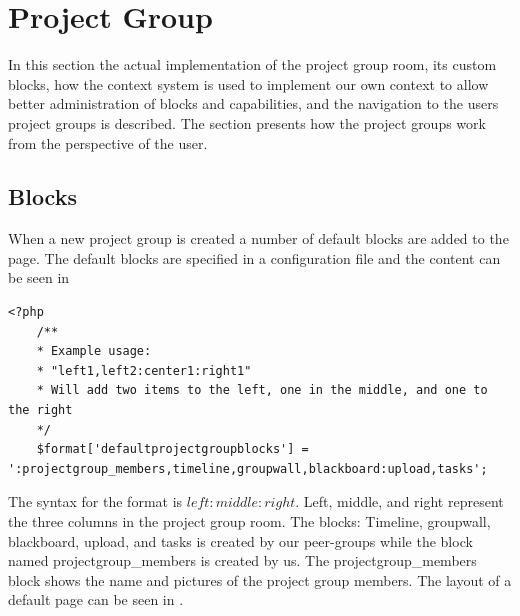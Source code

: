 \section{Project Group \viewroom[c]}
\label{sec:projGroupRoomImpl}
In this section the actual implementation of the project group room, its custom blocks, how the context system is used to implement our own context to allow better administration of blocks and capabilities, and the navigation to the users project groups is described.
The section presents how the project groups work from the perspective of the user. 







\subsection{Blocks}
\label{sec:implprojectgroupblocks}
When a new project group is created a number of default blocks are added to the page. 
The default blocks are specified in a configuration file and the content can be seen in 


\begin{lstlisting}[style=phpCode, caption=\myCaption{The default block configuration}, label=moodledaultblock]
<?php
	/**
	* Example usage:
	* "left1,left2:center1:right1"
	* Will add two items to the left, one in the middle, and one to the right
	*/
	$format['defaultprojectgroupblocks'] = ':projectgroup_members,timeline,groupwall,blackboard:upload,tasks';
\end{lstlisting}
The syntax for the format is $left:middle:right$. 
Left, middle, and right represent the three columns in the project group room. 
The blocks: Timeline, groupwall, blackboard, upload, and tasks is created by our peer-groups while the block named projectgroup\_members is created by us. 
The projectgroup\_members block shows the name and pictures of the project group members. 
The layout of a default page can be seen in .

	
	





